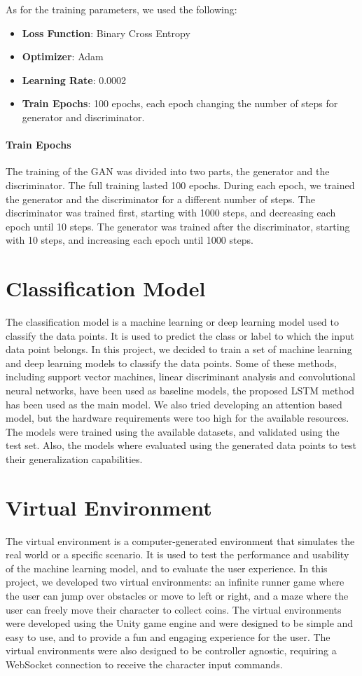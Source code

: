 As for the training parameters, we used the following:
\begin{itemize}
    \item \textbf{Loss Function}: Binary Cross Entropy
    \item \textbf{Optimizer}: Adam
    \item \textbf{Learning Rate}: 0.0002
    \item \textbf{Train Epochs}: 100 epochs, each epoch changing the number of steps for generator and discriminator.
\end{itemize}
\paragraph*{Train Epochs}
The training of the GAN was divided into two parts, the generator and the discriminator.
The full training lasted 100 epochs.
During each epoch, we trained the generator and the discriminator for a different number of steps.
The discriminator was trained first, starting with 1000 steps, and decreasing each epoch until 10 steps.
The generator was trained after the discriminator, starting with 10 steps, and increasing each epoch until 1000 steps.


\section{Classification Model}
The classification model is a machine learning or deep learning model used to classify the data points.
It is used to predict the class or label to which the input data point belongs.
In this project, we decided to train a set of machine learning and deep learning models to classify the data points.
Some of these methods, including support vector machines, linear discriminant analysis and convolutional neural networks, have been used as baseline models, the proposed LSTM method has been used as the main model.
We also tried developing an attention based model, but the hardware requirements were too high for the available resources.
The models were trained using the available datasets, and validated using the test set.
Also, the models where evaluated using the generated data points to test their generalization capabilities.

\section{Virtual Environment}
The virtual environment is a computer-generated environment that simulates the real world or a specific scenario.
It is used to test the performance and usability of the machine learning model, and to evaluate the user experience.
In this project, we developed two virtual environments: an infinite runner game where the user can jump over obstacles or move to left or right, and a maze where the user can freely move their character to collect coins.
The virtual environments were developed using the Unity game engine and were designed to be simple and easy to use, and to provide a fun and engaging experience for the user.
The virtual environments were also designed to be controller agnostic, requiring a WebSocket connection to receive the character input commands.

